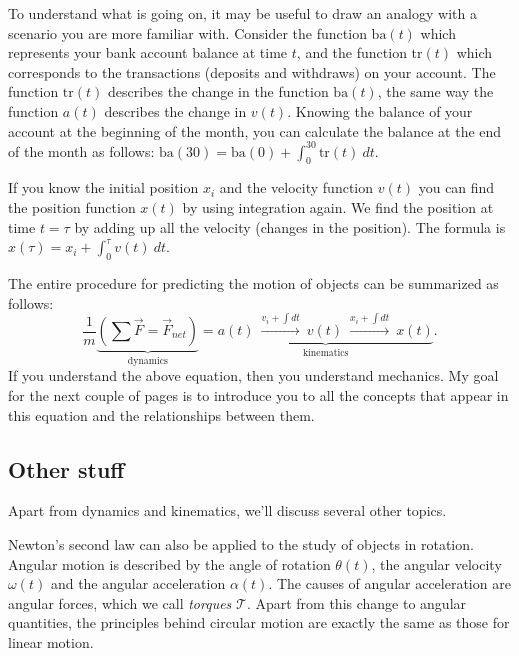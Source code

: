 \documentclass[letterpaper,9pt,journal]{IEEEtran}
\def\mcal{\mathcal}
\begin{document}
To understand what is going on, it may be useful to draw an analogy with a scenario you are more familiar with.
Consider the function $\textrm{ba}(t)$ which represents your bank account balance at time $t$,
and the function $\textrm{tr}(t)$ which corresponds to the transactions (deposits and withdraws) on your account.
The function $\textrm{tr}(t)$ describes the change in the function $\textrm{ba}(t)$,
the same way the function $a(t)$ describes the change in $v(t)$.
Knowing the balance of your account at the beginning of the month,
you can calculate the balance at the end of the month as follows: $\textrm{ba}(30)=\textrm{ba}(0)+\int_0^{30} \textrm{tr}(t)\:dt$.

If you know the initial position $x_i$ and the velocity function $v(t)$ you can find the position function $x(t)$ by using integration again.  
We find the position at time $t=\tau$ by adding up all the velocity (changes in the position). 
The formula is $x(\tau) = x_i + \int_0^\tau v(t)\:dt$.


The entire procedure for predicting the motion of objects can be summarized as follows:
\begin{equation}
\frac{1}{m} \underbrace{ \left( \sum \vec{F} = \vec{F}_{net}  \right) }_{\text{dynamics}} = \underbrace{ a(t) \ \overset{v_i+ \int\!dt }{\longrightarrow} \ v(t) \ \overset{x_i+ \int\!dt }{\longrightarrow} \ x(t) }_{\text{kinematics}}.
 \label{fma-eqn}
\end{equation}
%
If you understand the above equation, then you understand mechanics.
My goal for the next couple of pages is to introduce you to all the concepts that 
appear in this equation and the relationships between them. 




\vspace{-3mm}
\subsection{Other stuff}

Apart from dynamics and kinematics, we'll discuss several other topics.

Newton's second law can also be applied to the study of objects in rotation.
Angular motion is described by the angle of rotation $\theta(t)$, 
the angular velocity $\omega(t)$ and the angular acceleration $\alpha(t)$.
The causes of angular acceleration are angular forces, which we call \emph{torques} $\mathcal{T}$.
Apart from this change to angular quantities, the principles behind circular motion 
are exactly the same as those for linear motion.
\end{document}
